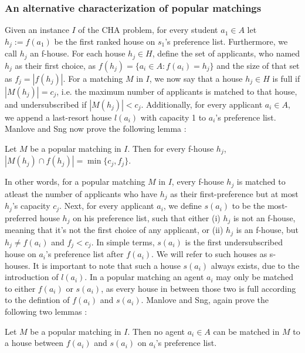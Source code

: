 \subsubsection{An alternative characterization of popular matchings}
Given an instance $I$ of the CHA problem, for every student $a_1 \in A$ let $h_j := f(a_1)$ be the first ranked house on $s_1$'s preference list. Furthermore, we call $h_j$ an f-house. For each house $h_j \in H$, define the set of applicants, who named $h_j$ as their first choice, as $f(h_j) = \{a_i \in A: f(a_i) = h_j\}$ and the size of that set as $f_j = |f(h_j)|$. For a matching $M$ in $I$, we now say that a house $h_j \in H$ is full if $|M(h_j)| = c_j$, i.e. the maximum number of applicants is matched to that house, and undersubscribed if $|M(h_j)| < c_j$. Additionally, for every applicant $a_i \in A$, we append a last-resort house $l(a_i)$ with capacity 1 to $a_i$'s preference list.\cite{ManlovePopularMatchings} Manlove and Sng now prove the following lemma \cite{ManlovePopularMatchings}:
\newtheorem{lemma-popular-1}[theorem]{Lemma}
\begin{lemma}\label{lemma-popular1}
    Let $M$ be a popular matching in $I$. Then for every f-house $h_j$, $|M(h_j) \cap f(h_j)| = \min\{c_j, f_j\}$.
\end{lemma} 
In other words, for a popular matching $M$ in $I$, every f-house $h_j$ is matched to atleast the number of applicants who have $h_j$ as their first-preference but at most $h_j$'s capacity $c_j$. Next, for every applicant $a_i$, we define $s(a_i)$ to be the most-preferred house $h_j$ on his preference list, such that either (i) $h_j$  is not an f-house, meaning that it's not the first choice of any applicant, or (ii) $h_j$ is an f-house, but $h_j \neq f(a_i)$ and $f_j < c_j$. In simple terms, $s(a_i)$ is the first undersubscribed house on $a_i$'s preference list after $f(a_i)$. We will refer to such houses as s-houses. It is important to note that such a house $s(a_i)$ always exists, due to the introduction of $l(a_i)$. In a popular matching an agent $a_i$ may only be matched to either $f(a_i)$ or $s(a_i)$, as every house in between those two is full according to the defintion of $f(a_i)$ and $s(a_i)$. Manlove and Sng, again prove the following two lemmas \cite{ManlovePopularMatchings}: 

\newtheorem{lemma-popular-2}[theorem]{Lemma}
\begin{lemma}\label{lemma-popular2}
    Let $M$ be a popular matching in $I$. Then no agent $a_i \in A$ can be matched in $M$ to a house between $f(a_i)$ and $s(a_i)$ on $a_i$'s preference list.
\end{lemma} 

